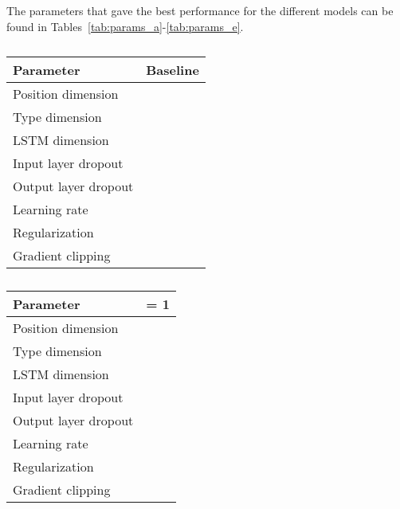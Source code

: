 \documentclass[11pt,a4paper]{article}
\begin{document}
	The parameters that gave the best performance for the different models can be found in Tables~\ref{tab:params_a}-\ref{tab:params_e}.
	\begin{table}[ht!]
    		\centering
			\begin{subtable}[ht!]{0.4\textwidth}
	             \begin{tabular}{|l|r|}
	                 \hline 
	                 Parameter & Baseline \\
	                 \hline \hline
	                 Position dimension   &  \\
	                 Type dimension 	  &  \\
	                 LSTM dimension 	  &  \\
	                 Input layer dropout 	  &  \\
	                 Output layer dropout 	  &  \\
	                 Learning rate 			  &  \\
	                 Regularization 		  &   \\
	                 Gradient clipping		  &  \\
	                 \hline
	             \end{tabular}
             	\subcaption{}
             	\label{tab:params_a}
			\end{subtable}
	             
            \vspace{0.5cm}
            
			\begin{subtable}[ht!]{0.4\textwidth}
	             \begin{tabular}{|l|r|}
	                 \hline 
	                 Parameter &  = 1 \\
	                 \hline \hline
	                 Position dimension   &  \\
	                 Type dimension 	  &  \\
	                 LSTM dimension 	  &  \\
	                 Input layer dropout 	  &  \\
	                 Output layer dropout 	  &  \\
	                 Learning rate 			  &  \\
	                 Regularization 		  &   \\
	                 Gradient clipping		  &  \\
	                 \hline
	             \end{tabular}
             	\caption{}
             	\label{tab:params_b}
			\end{subtable}
	             

\end{table}
\end{document}
